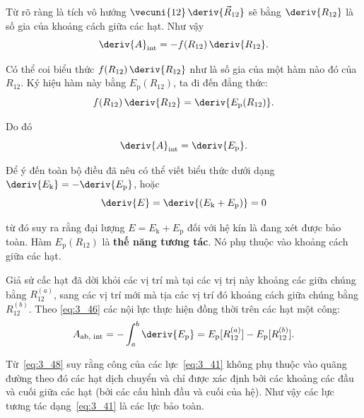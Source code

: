 \noindent
Từ  rõ ràng là tích vô hướng $\vecuni{12}\,\deriv{\vec{R}_{12}}$ sẽ bằng $\deriv{R_{12}}$ là số gia của khoảng cách giữa các hạt. Như vậy
\begin{equation}\label{eq:3_44}
\deriv{A}_{\text{int}} = - f(R_{12})\,\deriv{R_{12}}.
\end{equation}


Có thể coi biểu thức $f(R_{12})\,\deriv{R_{12}}$  như là số gia của một hàm nào đó của $R_{12}$. Ký hiệu hàm này bằng $E_{\text{p}}(R_{12})$, ta đi đến đẳng thức:
\begin{equation}\label{eq:3_45}
f(R_{12})\,\deriv{R_{12}} = \deriv{E_{\text{p}}(R_{12})}.
\end{equation}

\noindent
Do đó
\begin{equation}\label{eq:3_46}
\deriv{A}_{\text{int}} = \deriv{E_{\text{p}}}.
\end{equation}

 Để ý đến toàn bộ điều đã nêu có thể viết biểu thức  dưới dạng $\deriv{E_{\text{k}}}=-\deriv{E_{\text{p}}}$, hoặc
\begin{equation}\label{eq:3_47}
\deriv{E} = \deriv{(E_{\text{k}}+E_{\text{p}})} = 0
\end{equation}

\noindent
từ đó suy ra rằng đại lượng $E=E_{\text{k}}+E_{\text{p}}$ đối với hệ kín là đang xét được bảo toàn. Hàm $E_{\text{p}}(R_{12})$ 
 là \textbf{thế năng tương tác}. Nó phụ thuộc vào khoảng cách giữa các hạt.

Giả sử cấc hạt đã dời khỏi các vị trí mà tại các vị trị này khoảng các giữa chúng bằng $R_{12}^{(a)}$, sang các vị trí mới mà tịa các vị trí đó khoảng cách giữa chúng bằng $R_{12}^{(b)}$. Theo \eqref{eq:3_46} các nội lực thực hiện đồng thời trên các hạt một công: 
\begin{equation}\label{eq:3_48}
A_{\text{ab, int}} = - \int_{a}^{b} \deriv{E_{\text{p}}} = E_{\text{p}}[R_{12}^{(a)}] - E_{\text{p}}[R_{12}^{(b)}].
\end{equation}

\noindent
Từ~\eqref{eq:3_48} suy rằng công của các lực~\eqref{eq:3_41} không phụ thuộc vào quãng đường theo đó các hạt dịch chuyển và chỉ được xác định bởi các khoảng các đầu và cuối giữa các hạt (bởi các cấu hình đầu và cuối của hệ). Như vậy các lực tương tác dạng~\eqref{eq:3_41} là các lực bảo toàn.

